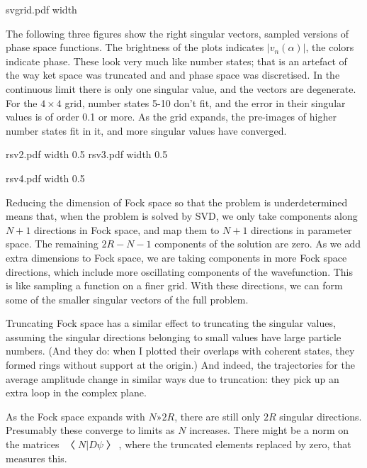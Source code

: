 \centerline{\XeTeXpicfile svgrid.pdf width \hsize}

The following three figures show the right singular vectors, sampled versions of phase space functions.  The brightness of the plots indicates $|v_n(α)|$, the colors indicate phase.  These look very much like number states; that is an artefact of the way ket space was truncated and and phase space was discretised.  In the continuous limit there is only one singular value, and the vectors are degenerate.  For the $4×4$ grid, number states 5-10 don't fit, and the error in their singular values is of order 0.1 or more.  As the grid expands, the pre-images of higher number states fit in it, and more singular values have converged.

\centerline{\XeTeXpicfile rsv2.pdf width 0.5\hsize
\XeTeXpicfile rsv3.pdf width 0.5\hsize}
\centerline{\XeTeXpicfile rsv4.pdf width 0.5\hsize}

Reducing the dimension of Fock space so that the problem is underdetermined means that, when the problem is solved by SVD, we only take components along $N+1$ directions in Fock space, and map them to $N+1$ directions in parameter space.  The remaining $2R-N-1$ components of the solution are zero.  As we add extra dimensions to Fock space, we are taking components in more Fock space directions, which include more oscillating components of the wavefunction.  This is like sampling a function on a finer grid.  With these directions, we can form some of the smaller singular vectors of the full problem.

Truncating Fock space has a similar effect to truncating the singular values, assuming the singular directions belonging to small values have large particle numbers.  (And they do: when I plotted their overlaps with coherent states, they formed rings without support at the origin.)  And indeed, the trajectories for the average amplitude change in similar ways due to truncation: they pick up an extra loop in the complex plane.

As the Fock space expands with $N»2R$, there are still only $2R$ singular directions.  Presumably these converge to limits as $N$ increases.  There might be a norm on the matrices $〈N|Dψ〉$, where the truncated elements replaced by zero, that measures this.


